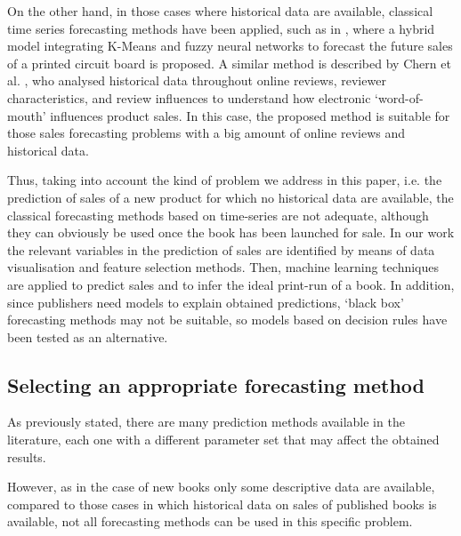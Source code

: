 \documentclass[a4paper,10pt,twocolumn,preprint,3p]{elsarticle}
\begin{document}
On the other hand, in those cases where historical data are available, classical time series forecasting methods have been applied, such as in \cite{Chang2009}, 
where a hybrid model integrating K-Means and fuzzy neural networks to forecast 
the future sales of a printed circuit board is proposed.
A similar method is described by Chern et al. \cite{ChernWSF15}, who analysed 
historical data throughout online reviews, reviewer characteristics, and review 
influences to understand how electronic `word-of-mouth' influences product sales. 
In this case, the proposed method is suitable for those sales forecasting problems 
with a big amount of online reviews and historical data.

Thus, taking into account the kind of problem we address in this
paper, i.e. the prediction of sales of a new product for which no
historical data are available, the classical forecasting methods based
on time-series are not adequate, although they can obviously be used once 
the book has been launched for sale. 
In our work the relevant variables in the prediction of sales are identified
by means of data visualisation and feature selection methods. 
Then, machine learning techniques are applied to predict sales and to infer 
the ideal print-run of a book.
In addition, since publishers need models to explain obtained predictions, 
`black box' forecasting methods may not be suitable, so models based
on decision rules have been tested as an alternative. 



\subsection{Selecting an appropriate forecasting method}
\label{subsec:select_method}

As previously stated, there are many prediction methods available in the 
literature, each one with a different parameter set that may affect the 
obtained results.

However, as in the case of new books only some descriptive data are available,
compared to those cases in which historical data on sales of published books 
is available, not all forecasting methods can be used in this specific problem.
\end{document}
